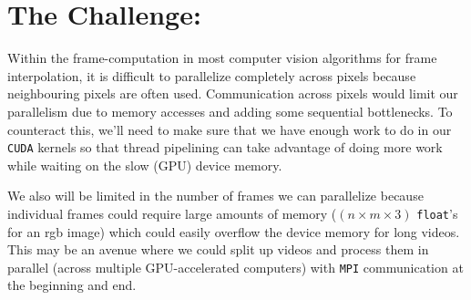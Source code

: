 \documentclass[12pt]{article}
\begin{document}
\section*{The Challenge:}
\par Within the frame-computation in most computer vision algorithms for frame interpolation, it is difficult to parallelize completely across pixels because neighbouring pixels are often used. Communication across pixels would limit our parallelism due to memory accesses and adding some sequential bottlenecks. To counteract this, we'll need to make sure that we have enough work to do in our \texttt{CUDA} kernels so that thread pipelining can take advantage of doing more work while waiting on the slow (GPU) device memory. 
\par We also will be limited in the number of frames we can parallelize because individual frames could require large amounts of memory ($(n \times m \times 3)$ \texttt{float}'s for an rgb image) which could easily overflow the device memory for long videos. This may be an avenue where we could split up videos and process them in parallel (across multiple GPU-accelerated computers) with \texttt{MPI} communication at the beginning and end. 
\end{document}
